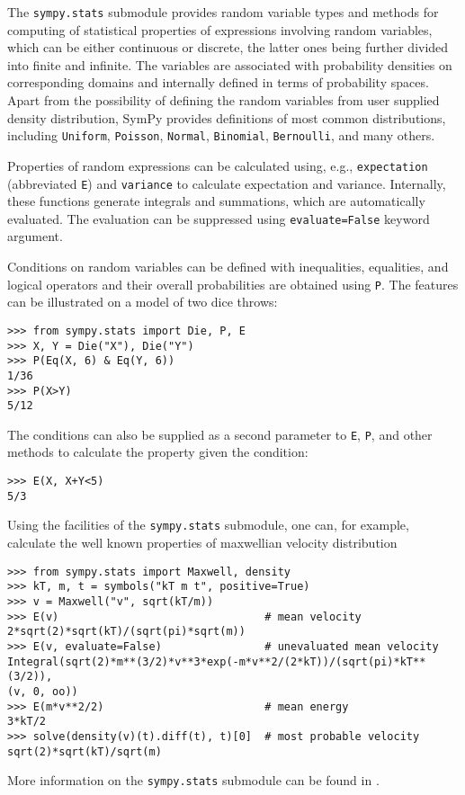The \verb|sympy.stats| submodule provides random variable types and methods for
computing of statistical properties of expressions involving random
variables, which can be either continuous or discrete, the latter ones being
further divided into finite and infinite. The variables are associated
with probability densities on corresponding domains and internally defined
in terms of probability spaces.
Apart from the possibility of defining the random variables from user supplied
density distribution, SymPy provides definitions of most common
distributions, including \texttt{Uniform}, \texttt{Poisson}, \texttt{Normal},
\texttt{Binomial}, \texttt{Bernoulli}, and many others.

Properties of random expressions can be calculated using, e.g.,
\texttt{expectation} (abbreviated \texttt{E}) and \texttt{variance} to
calculate expectation and variance. Internally, these functions generate
integrals and summations, which are automatically evaluated. The evaluation
can be suppressed using \texttt{evaluate=False} keyword argument.

Conditions on random variables can be defined with inequalities, equalities,
and logical operators and their overall probabilities are obtained using
\texttt{P}. The features can be illustrated on a model of two dice throws:
\begin{verbatim}
>>> from sympy.stats import Die, P, E
>>> X, Y = Die("X"), Die("Y")
>>> P(Eq(X, 6) & Eq(Y, 6))
1/36
>>> P(X>Y)
5/12
\end{verbatim}
The conditions can also be supplied as a second parameter to \texttt{E},
\texttt{P}, and other methods to calculate the property given the condition:
\begin{verbatim}
>>> E(X, X+Y<5)
5/3
\end{verbatim}

Using the facilities of the \texttt{sympy.stats} submodule, one can, for
example, calculate
the well known properties of maxwellian velocity distribution
\begin{verbatim}
>>> from sympy.stats import Maxwell, density
>>> kT, m, t = symbols("kT m t", positive=True)
>>> v = Maxwell("v", sqrt(kT/m))
>>> E(v)                                # mean velocity
2*sqrt(2)*sqrt(kT)/(sqrt(pi)*sqrt(m))
>>> E(v, evaluate=False)                # unevaluated mean velocity
Integral(sqrt(2)*m**(3/2)*v**3*exp(-m*v**2/(2*kT))/(sqrt(pi)*kT**(3/2)),
(v, 0, oo))
>>> E(m*v**2/2)                         # mean energy
3*kT/2
>>> solve(density(v)(t).diff(t), t)[0]  # most probable velocity
sqrt(2)*sqrt(kT)/sqrt(m)
\end{verbatim}

More information on the \texttt{sympy.stats} submodule can be found in
\cite{StatsMRocklin}.
